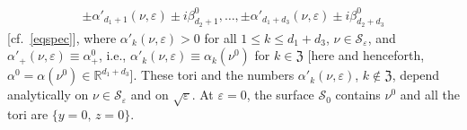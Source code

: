 \documentclass[12pt,reqno]{amsart}
\theoremstyle{definition}
\begin{document}
\begin{thm}
\begin{equation}
\begin{gathered}
\pm\alpha'_{d_1+1}(\nu,{\varepsilon})\pm i\beta^0_{d_2+1},\ldots,
\pm\alpha'_{d_1+d_3}(\nu,{\varepsilon})\pm i\beta^0_{d_2+d_3}
\end{gathered}
\label{eqprime}
\end{equation}
\textup{[}cf.~\eqref{eqspec}\textup{]}, where $\alpha'_k(\nu,{\varepsilon})>0$ for all
$1{\leqslant} k{\leqslant} d_1+d_3$, $\nu\in{\mathcal S}_{\varepsilon}$, and
$\alpha'_+(\nu,{\varepsilon})\equiv\alpha^0_+$, i.e.,
$\alpha'_k(\nu,{\varepsilon})\equiv\alpha_k(\nu^0)$ for $k\in{\mathfrak Z}$ \textup{[}here and
henceforth, $\alpha^0=\alpha(\nu^0)\in{\mathbb R}^{d_1+d_3}$\textup{]}. These tori and
the numbers $\alpha'_k(\nu,{\varepsilon})$, $k\notin{\mathfrak Z}$, depend analytically on
$\nu\in{\mathcal S}_{\varepsilon}$ and on ${\sqrt{\varepsilon}}$. At ${\varepsilon}=0$, the surface ${\mathcal S}_0$ contains
$\nu^0$ and all the tori are $\{y=0, \, z=0\}$.
\end{thm}
\end{document}
